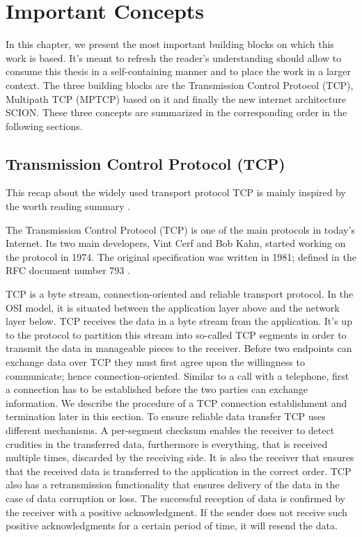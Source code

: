 
\chapter{Important Concepts}
\label{chap:Concepts}
In this chapter, we present the most important building blocks on which this work is based. It's meant to refresh the reader's understanding should allow to consume this thesis in a self-containing manner and to place the work in a larger context. The three building blocks are the Transmission Control Protocol (TCP), Multipath TCP (MPTCP) based on it and finally the new internet architecture SCION. These three concepts are summarized in the corresponding order in the following sections.

\section{Transmission Control Protocol (TCP)}
\label{sec:TCP}

This recap about the widely used transport protocol TCP is mainly inspired by the worth reading summary \cite{TCPSummary}.

The Transmission Control Protocol (TCP) is one of the main protocols in today's Internet. Its two main developers, Vint Cerf and Bob Kahn, started working on the protocol in 1974. The original specification was written in 1981; defined in the RFC document number 793 \cite{rfc793}.

TCP is a byte stream, connection-oriented and reliable transport protocol. In the OSI model, it is situated between the application layer above and the network layer below. TCP receives the data in a byte stream from the application. It's up to the protocol to partition this stream into so-called TCP segments in order to transmit the data in manageable pieces to the receiver. Before two endpoints can exchange data over TCP they must first agree upon the willingness to communicate; hence connection-oriented. Similar to a call with a telephone, first a connection has to be established before the two parties can exchange information. We describe the procedure of a TCP connection establishment and termination later in this section. To ensure reliable data transfer TCP uses different mechanisms. A per-segment checksum enables the receiver to detect crudities in the transferred data, furthermore is everything, that is received multiple times, discarded by the receiving side. It is also the receiver that ensures that the received data is transferred to the application in the correct order. TCP also has a retransmission functionality that ensures delivery of the data in the case of data corruption or loss. The successful reception of data is confirmed by the receiver with a positive acknowledgment. If the sender does not receive such positive acknowledgments for a certain period of time, it will resend the data. 

